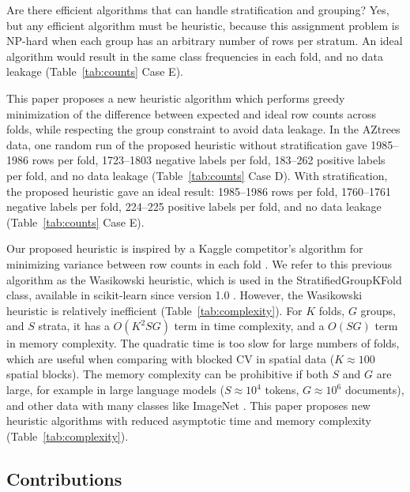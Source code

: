 \documentclass[twoside]{article}
\begin{document}
Are there efficient algorithms that can handle stratification and grouping?
Yes, but any efficient algorithm must be heuristic, because this assignment problem is NP-hard when each group has an arbitrary number of rows per stratum.
An ideal algorithm would result in the same class frequencies in each fold, and no data leakage (Table~\ref{tab:counts} Case E).

This paper proposes a new heuristic algorithm which performs greedy minimization of the difference between expected and ideal row counts across folds, while respecting the group constraint to avoid data leakage.
In the AZtrees data, one random run of the proposed heuristic without stratification gave 1985--1986 rows per fold, 1723--1803 negative labels per fold, 183--262 positive labels per fold, and no data leakage (Table~\ref{tab:counts} Case D).
With stratification, the proposed heuristic gave an ideal result: 1985--1986 rows per fold, 1760--1761 negative labels per fold, 224--225 positive labels per fold, and no data leakage (Table~\ref{tab:counts} Case E).

Our proposed heuristic is inspired by a Kaggle competitor’s algorithm for minimizing variance between row counts in each fold \citep{Wasikowski2019}.
We refer to this previous algorithm as the Wasikowski heuristic, which is used in the StratifiedGroupKFold class, available in scikit-learn since version 1.0 \citep{pr18649,whatsnew}.
However, the Wasikowski heuristic is relatively inefficient (Table~\ref{tab:complexity}).
For $K$ folds, $G$ groups, and $S$ strata, it has a $O(K^2 SG)$ term in time complexity, and a $O(SG)$ term in memory complexity.
The quadratic time is too slow for large numbers of folds, which are useful when comparing with blocked CV in spatial data \citep{ploton2020} ($K\approx 100$ spatial blocks).
The memory complexity can be prohibitive if both $S$ and $G$ are large, for example in large language models \citep{yang2024} ($S\approx 10^4$ tokens, $G\approx 10^6$ documents), and other data with many classes like ImageNet \citep{imagenet}.
This paper proposes new heuristic algorithms with reduced asymptotic time and memory complexity (Table~\ref{tab:complexity}).

\subsection{Contributions}
\end{document}
